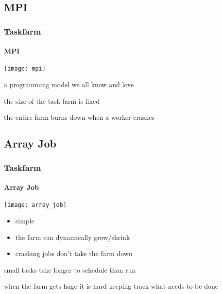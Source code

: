 \subsection{MPI}
\begin{frame}
  \frametitle{Taskfarm}
  \framesubtitle{MPI} 
    \begin{center}
      \begin{minipage}{0.7\textwidth}
        \texttt{[image: mpi]}
      \end{minipage}
  \end{center}
  \vfill
  \begin{minipage}[t][0.5\textheight][t]{\textwidth}
    \begin{description}
    \item<2->[good] a programming model we all know and love
    \item<3->[bad] the size of the task farm is fixed
    \item<4->[ugly] the entire farm burns down when a worker crashes
    \end{description}
  \end{minipage}
\end{frame}

\subsection{Array Job}
\begin{frame}
  \frametitle{Taskfarm}
  \framesubtitle{Array Job} 
    \begin{center}
      \begin{minipage}{0.7\textwidth}
        \texttt{[image: array\_job]}
      \end{minipage}
  \end{center}
  \vfill
  \begin{minipage}[t][0.5\textheight][t]{\textwidth}
    \begin{description}
    \item<2->[good]
      \begin{itemize}
      \item simple
      \item the farm can dynamically grow/shrink
      \item crashing jobs don't take the farm down
      \end{itemize}
    \item<3->[bad] small tasks take longer to schedule than run
    \item<4->[ugly] when the farm gets huge it is hard keeping track what needs to be done
    \end{description}
  \end{minipage}
\end{frame}

